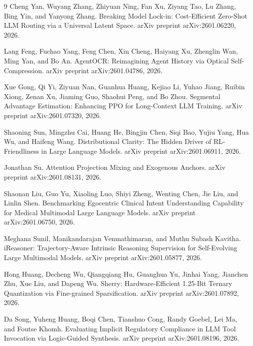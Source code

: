 \documentclass{article}
\begin{document}
\begin{thebibliography}{9}
Cheng Yan, Wuyang Zhang, Zhiyuan Ning, Fan Xu, Ziyang Tao, Lu Zhang, Bing Yin, and Yanyong Zhang. Breaking Model Lock-in: Cost-Efficient Zero-Shot LLM Routing via a Universal Latent Space. arXiv preprint arXiv:2601.06220, 2026.

Lang Feng, Fuchao Yang, Feng Chen, Xin Cheng, Haiyang Xu, Zhenglin Wan, Ming Yan, and Bo An. AgentOCR: Reimagining Agent History via Optical Self-Compression. arXiv preprint arXiv:2601.04786, 2026.

Xue Gong, Qi Yi, Ziyuan Nan, Guanhua Huang, Kejiao Li, Yuhao Jiang, Ruibin Xiong, Zenan Xu, Jiaming Guo, Shaohui Peng, and Bo Zhou. Segmental Advantage Estimation: Enhancing PPO for Long-Context LLM Training. arXiv preprint arXiv:2601.07320, 2026.

Shaoning Sun, Mingzhu Cai, Huang He, Bingjin Chen, Siqi Bao, Yujiu Yang, Hua Wu, and Haifeng Wang. Distributional Clarity: The Hidden Driver of RL-Friendliness in Large Language Models. arXiv preprint arXiv:2601.06911, 2026.

Jonathan Su. Attention Projection Mixing and Exogenous Anchors. arXiv preprint arXiv:2601.08131, 2026.

Shaonan Liu, Guo Yu, Xiaoling Luo, Shiyi Zheng, Wenting Chen, Jie Liu, and Linlin Shen. Benchmarking Egocentric Clinical Intent Understanding Capability for Medical Multimodal Large Language Models. arXiv preprint arXiv:2601.06750, 2026.

Meghana Sunil, Manikandarajan Venmathimaran, and Muthu Subash Kavitha. iReasoner: Trajectory-Aware Intrinsic Reasoning Supervision for Self-Evolving Large Multimodal Models. arXiv preprint arXiv:2601.05877, 2026.

Hong Huang, Decheng Wu, Qiangqiang Hu, Guanghua Yu, Jinhai Yang, Jianchen Zhu, Xue Liu, and Dapeng Wu. Sherry: Hardware-Efficient 1.25-Bit Ternary Quantization via Fine-grained Sparsification. arXiv preprint arXiv:2601.07892, 2026.

Da Song, Yuheng Huang, Boqi Chen, Tianshuo Cong, Randy Goebel, Lei Ma, and Foutse Khomh. Evaluating Implicit Regulatory Compliance in LLM Tool Invocation via Logic-Guided Synthesis. arXiv preprint arXiv:2601.08196, 2026.


\end{thebibliography}
\end{document}
